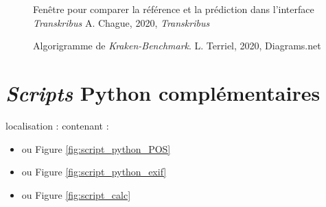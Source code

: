 \begin{figure}
    \centering
    \centerline{}
    \caption{Fenêtre pour comparer la référence et la prédiction dans l'interface \textit{Transkribus} \textcopyright A. Chague, 2020, \textit{Transkribus}}
    \label{fig:compare-texts-transkribus}
\end{figure}

\begin{figure}
    \centering
    \centerline{}
    \caption{Algorigramme de \textit{Kraken-Benchmark}.   \textcopyright L. Terriel, 2020, Diagrams.net}
    \label{fig:algo-kb}
\end{figure}

\chapter{\textit{Scripts} Python complémentaires}\label{anx_scripts_comp}
localisation :  contenant :

\begin{itemize}
    \item {} ou Figure \ref{fig:script_python_POS}
    \item {} ou Figure \ref{fig:script_python_exif}
    \item {} ou Figure \ref{fig:script_calc}
\end{itemize}


